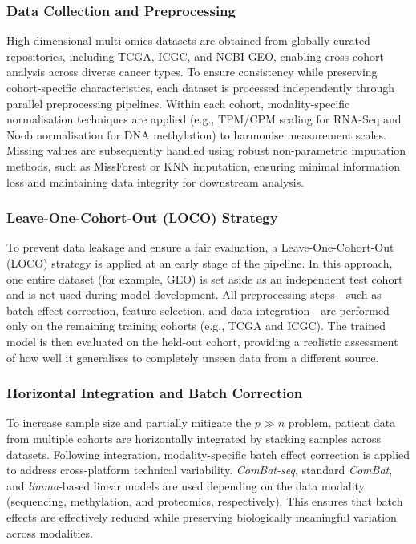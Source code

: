 \documentclass[conference]{IEEEtran}
\begin{document}
\subsubsection{\textbf{Data Collection and Preprocessing}} High-dimensional multi-omics datasets are obtained from globally curated repositories, including TCGA, ICGC, and NCBI GEO, enabling cross-cohort analysis across diverse cancer types. To ensure consistency while preserving cohort-specific characteristics, each dataset is processed independently through parallel preprocessing pipelines. Within each cohort, modality-specific normalisation techniques are applied (e.g., TPM/CPM scaling for RNA-Seq and Noob normalisation for DNA methylation) to harmonise measurement scales. Missing values are subsequently handled using robust non-parametric imputation methods, such as MissForest or KNN imputation, ensuring minimal information loss and maintaining data integrity for downstream analysis.
\subsubsection{\textbf{Leave-One-Cohort-Out (LOCO) Strategy}} To prevent data leakage and ensure a fair evaluation, a Leave-One-Cohort-Out (LOCO) strategy is applied at an early stage of the pipeline. In this approach, one entire dataset (for example, GEO) is set aside as an independent test cohort and is not used during model development. All preprocessing steps—such as batch effect correction, feature selection, and data integration—are performed only on the remaining training cohorts (e.g., TCGA and ICGC). The trained model is then evaluated on the held-out cohort, providing a realistic assessment of how well it generalises to completely unseen data from a different source.
\subsubsection{\textbf{Horizontal Integration and Batch Correction}} To increase sample size and partially mitigate the \( p \gg n \) problem, patient data from multiple cohorts are horizontally integrated by stacking samples across datasets. Following integration, modality-specific batch effect correction is applied to address cross-platform technical variability. \textit{ComBat-seq}, standard \textit{ComBat}, and \textit{limma}-based linear models are used depending on the data modality (sequencing, methylation, and proteomics, respectively). This ensures that batch effects are effectively reduced while preserving biologically meaningful variation across modalities.
\end{document}

